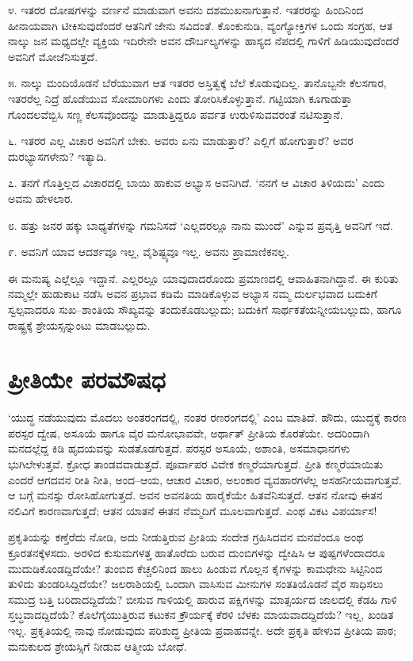೪. ಇತರರ ದೋಷಗಳನ್ನು ವರ್ಣನೆ ಮಾಡುವಾಗ ಅವನು ದಶಮುಖನಾಗುತ್ತಾನೆ. ಇತರರನ್ನು ಹಿಂದಿನಿಂದ ಹೀನಾಯವಾಗಿ ಟೀಕಿಸುವುದೆಂದರೆ ಆತನಿಗೆ ಜೇನು ಸವಿದಂತೆ. ಕೊಂಕು\-ನುಡಿ, ವ್ಯಂಗ್ಯೋಕ್ತಿಗಳ ಒಂದು ಸಂಗ್ರಹ, ಆತ ನಾಲ್ಕು ಜನ ಮಧ್ಯದಲ್ಲೇ ವ್ಯಕ್ತಿಯ ಇದಿರೇನೇ ಅವನ ದೌರ್ಬಲ್ಯಗಳನ್ನು ಹಾಸ್ಯದ ನೆಪದಲ್ಲಿ ಗಾಳಿಗೆ ಹಿಡಿಯುವುದೆಂದರೆ ಅವನಿಗೆ ಮೋಜೆನಿಸುತ್ತದೆ.

೫. ನಾಲ್ಕು ಮಂದಿಯೊಡನೆ ಬೆರೆಯುವಾಗ ಆತ ಇತರರ ಅಸ್ತಿತ್ವಕ್ಕೆ ಬೆಲೆ ಕೊಡುವುದಿಲ್ಲ. ತಾನೊಬ್ಬನೇ ಕೆಲಸಗಾರ, ಇತರರೆಲ್ಲ ನಿದ್ರೆ ಹೊಡೆಯುವ ಸೋಮಾರಿಗಳು ಎಂದು ತೋರಿಸಿಕೊಳ್ಳುತ್ತಾನೆ. ಗಟ್ಟಿಯಾಗಿ ಕೂಗಾಡುತ್ತಾ ಗೊಂದಲವೆಬ್ಬಿಸಿ ಸಣ್ಣ ಕೆಲಸವೊಂದನ್ನು ಮಾಡುತ್ತಿದ್ದರೂ ಪರ್ವತ ಉರುಳಿಸುವವರಂತೆ ನಟಿಸುತ್ತಾನೆ.

೬. ಇತರರ ಎಲ್ಲ ವಿಚಾರ ಅವನಿಗೆ ಬೇಕು. ಅವರು ಏನು ಮಾಡುತ್ತಾರೆ? ಎಲ್ಲಿಗೆ ಹೋಗುತ್ತಾರೆ? ಅವರ ದುರಭ್ಯಾಸಗಳೇನು? ಇತ್ಯಾದಿ.

೭. ತನಗೆ ಗೊತ್ತಿಲ್ಲದ ವಿಚಾರದಲ್ಲಿ ಬಾಯಿ ಹಾಕುವ ಅಭ್ಯಾಸ ಅವನಿಗಿದೆ. ‘ನನಗೆ ಆ ವಿಚಾರ ತಿಳಿಯದು’ ಎಂದು ಅವನು ಹೇಳಲಾರ.

೮. ಹತ್ತು ಜನರ ಹಕ್ಕು ಬಾಧ್ಯತೆಗಳನ್ನು ಗಮನಿಸದೆ ‘ಎಲ್ಲದರಲ್ಲೂ ನಾನು ಮುಂದೆ’ ಎನ್ನುವ ಪ್ರವೃತ್ತಿ ಅವನಿಗೆ ಇದೆ.

೯. ಅವನಿಗೆ ಯಾವ ಆದರ್ಶವೂ ಇಲ್ಲ, ವೈಶಿಷ್ಟ್ಯವೂ ಇಲ್ಲ. ಅವನು ಪ್ರಾಮಾಣಿಕನಲ್ಲ.

ಈ ಮನುಷ್ಯ ಎಲ್ಲೆಲ್ಲೂ ಇದ್ದಾನೆ. ಎಲ್ಲರಲ್ಲೂ ಯಾವುದಾದರೊಂದು ಪ್ರಮಾಣದಲ್ಲಿ ಆವಾಹಿತನಾಗಿದ್ದಾನೆ. ಈ ಕುರಿತು ನಮ್ಮಲ್ಲೇ ಹುಡುಕಾಟ ನಡೆಸಿ ಅವನ ಪ್ರಭಾವ ಕಡಿಮೆ ಮಾಡಿಕೊಳ್ಳುವ ಅಭ್ಯಾಸ ನಮ್ಮ ದುರ್ಲಭವಾದ ಬದುಕಿಗೆ ಸ್ವಲ್ಪವಾದರೂ ಸುಖ–ಶಾಂತಿಯ ಸೌಖ್ಯವನ್ನು ತಂದುಕೊಡಬಲ್ಲುದು; ಬದುಕಿಗೆ ಸಾರ್ಥಕತೆಯನ್ನೀಯಬಲ್ಲುದು, ಹಾಗೂ ರಾಷ್ಟ್ರಕ್ಕೆ ಶ್ರೇಯಸ್ಸನ್ನುಂಟು ಮಾಡಬಲ್ಲುದು.


\section*{ಪ್ರೀತಿಯೇ ಪರಮೌಷಧ}


‘ಯುದ್ಧ ನಡೆಯುವುದು ಮೊದಲು ಅಂತರಂಗದಲ್ಲಿ, ನಂತರ ರಣರಂಗದಲ್ಲಿ’ ಎಂಬ ಮಾತಿದೆ. ಹೌದು, ಯುದ್ಧಕ್ಕೆ ಕಾರಣ ಪರಸ್ಪರ ದ್ವೇಷ, ಅಸೂಯೆ ಹಾಗೂ ವೈರ ಮನೋಭಾವವೇ, ಅರ್ಥಾತ್ ಪ್ರೀತಿಯ ಕೊರತೆಯೇ. ಅದರಿಂದಾಗಿ ಮನದಲ್ಲೆದ್ದ ಕಿಡಿ ಹೃದಯವನ್ನು ಸುಡತೊಡಗುತ್ತದೆ. ಪರಸ್ಪರ ಅಸೂಯೆ, ಅಶಾಂತಿ, ಅಸಮಾಧಾನಗಳು ಭುಗಿಲೇಳುತ್ತವೆ. ಕ್ರೋಧ ತಾಂಡವವಾಡುತ್ತದೆ. ಪೂರ್ವಾಪರ ವಿವೇಕ ಕಣ್ಮರೆಯಾಗುತ್ತದೆ. ಪ್ರೀತಿ ಕಣ್ಮರೆಯಾಯಿತು ಎಂದರೆ ಆಗದವನ ರೀತಿ ನೀತಿ, ಅಂದ–ಆಯ, ಆಚಾರ ವಿಚಾರ, ಅಲಂಕಾರ ವ್ಯವಹಾರಗಳೆಲ್ಲ ಅಸಹನೀಯವಾಗುತ್ತವೆ. ಆ ಬಗ್ಗೆ ಮನಸ್ಸು ರೋಸಿಹೋಗುತ್ತದೆ. ಅವನ ಅವನತಿಯ ಹಾರೈಕೆಯೇ ಹಿತವೆನಿಸುತ್ತದೆ. ಆತನ ನೋವು ಈತನ ನಲಿವಿಗೆ ಕಾರಣವಾಗುತ್ತದೆ; ಆತನ ಯಾತನೆ ಈತನ ನೆಮ್ಮದಿಗೆ ಮೂಲವಾಗುತ್ತದೆ. ಎಂಥ ವಿಕಟ ವಿಪರ್ಯಾಸ!

ಪ್ರಕೃತಿಯನ್ನು ಕಣ್ತೆರೆದು ನೋಡಿ, ಅದು ನೀಡುತ್ತಿರುವ ಪ್ರೀತಿಯ ಸಂದೇಶ ಗ್ರಹಿಸಿದವನ ಮನವೆಂದೂ ಅಂಥ ಕ್ರೂರತನಕ್ಕೆಳಸದು. ಅರಳಿದ ಕುಸುಮಗಳತ್ತ ಹಾತೊರೆದು ಬರುವ ದುಂಬಿಗಳನ್ನು ದ್ವೇಷಿಸಿ ಆ ಪುಷ್ಪಗಳೆಂದಾದರೂ ಮುದುಡಿಕೊಂಡದ್ದಿದೆಯೇ? ತುಂಬಿದ ಕೆಚ್ಚಲಿನಿಂದ ಹಾಲು ಹಿಂಡುವ ಗೊಲ್ಲನ ಕೈಗಳನ್ನು ಕಾಮಧೇನು ಸಿಟ್ಟಿನಿಂದ ತುಳಿದು ತುಂಡರಿಸಿದ್ದಿದೆಯೇ? ಜಲರಾಶಿಯಲ್ಲಿ ಒಂದಾಗಿ ವಾಸಿಸುವ ಮೀನುಗಳ ಸಂತತಿಯೊಡನೆ ವೈರ ಸಾಧಿಸಲು ಸಮುದ್ರ ಬತ್ತಿ ಬರಿದಾದದ್ದಿದೆಯೆ? ಬೀಸುವ ಗಾಳಿಯಲ್ಲಿ ಹಾರುವ ಪಕ್ಷಿಗಳನ್ನು ಮಾತ್ಸರ್ಯದ ಜಾಲದಲ್ಲಿ ಕೆಡಹಿ ಗಾಳಿ ಸ್ತಬ್ಧವಾದದ್ದಿದೆಯೆ? ಕೊಲೆಗೈಯುತ್ತಿರುವ ಕಟುಕನ ಕ್ರೌರ್ಯಕ್ಕೆ ಕೆರಳಿ ಬೆಳಕು ಮಾಯವಾದದ್ದಿದೆಯೆ? ಇಲ್ಲ, ಖಂಡಿತ ಇಲ್ಲ. ಪ್ರಕೃತಿಯಲ್ಲಿ ನಾವು ನೋಡುವುದು ಪರಿಶುದ್ಧ ಪ್ರೀತಿಯ ಪ್ರವಾಹವನ್ನೇ. ಅದೇ ಪ್ರಕೃತಿ ಹೇಳುವ ಪ್ರೀತಿಯ ಪಾಠ; ಮನುಕುಲದ ಶ್ರೇಯಸ್ಸಿಗೆ ನೀಡುವ ಆತ್ಮೀಯ ಬೋಧೆ.

